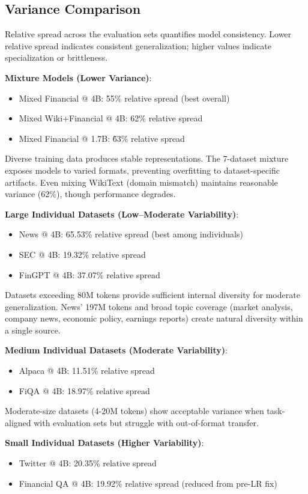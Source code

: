 \subsection{Variance Comparison}

Relative spread across the evaluation sets quantifies model consistency. Lower relative spread indicates consistent generalization; higher values indicate specialization or brittleness.

\textbf{Mixture Models (Lower Variance)}:
\begin{itemize}
\item Mixed Financial @ 4B: 55\% relative spread (best overall)
\item Mixed Wiki+Financial @ 4B: 62\% relative spread
\item Mixed Financial @ 1.7B: \~63\% relative spread
\end{itemize}

Diverse training data produces stable representations. The 7-dataset mixture exposes models to varied formats, preventing overfitting to dataset-specific artifacts. Even mixing WikiText (domain mismatch) maintains reasonable variance (62\%), though performance degrades.

\textbf{Large Individual Datasets (Low–Moderate Variability)}:
\begin{itemize}
\item News @ 4B: 65.53\% relative spread (best among individuals)
\item SEC @ 4B: 19.32\% relative spread
\item FinGPT @ 4B: 37.07\% relative spread
\end{itemize}

Datasets exceeding 80M tokens provide sufficient internal diversity for moderate generalization. News' 197M tokens and broad topic coverage (market analysis, company news, economic policy, earnings reports) create natural diversity within a single source.

\textbf{Medium Individual Datasets (Moderate Variability)}:
\begin{itemize}
\item Alpaca @ 4B: 11.51\% relative spread
\item FiQA @ 4B: 18.97\% relative spread
\end{itemize}

Moderate-size datasets (4-20M tokens) show acceptable variance when task-aligned with evaluation sets but struggle with out-of-format transfer.

\textbf{Small Individual Datasets (Higher Variability)}:
\begin{itemize}
\item Twitter @ 4B: 20.35\% relative spread
\item Financial QA @ 4B: 19.92\% relative spread (reduced from pre-LR fix)
\end{itemize}

